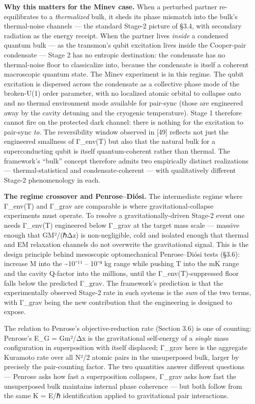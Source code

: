 \documentclass[
]{article}
\begin{document}
\textbf{Why this matters for the Minev case.} When a perturbed partner
re-equilibrates to a \emph{thermalized} bulk, it sheds its phase
mismatch into the bulk's thermal-noise channels --- the standard Stage-2
picture of §3.4, with secondary radiation as the energy receipt. When
the partner lives \emph{inside} a condensed quantum bulk --- as the
transmon's qubit excitation lives inside the Cooper-pair condensate ---
Stage 2 has no entropic destination: the condensate has no thermal-noise
floor to classicalize into, because the condensate is itself a coherent
macroscopic quantum state. The Minev experiment is in this regime. The
qubit excitation is dispersed across the condensate as a collective
phase mode of the broken-U(1) order parameter, with no localized atomic
orbital to collapse onto and no thermal environment mode available for
pair-sync (those are engineered away by the cavity detuning and the
cryogenic temperature). Stage 1 therefore cannot fire on the protected
dark channel: there is nothing for the excitation to pair-sync
\emph{to}. The reversibility window observed in {[}49{]} reflects not
just the engineered smallness of Γ\_env(T) but also that the natural
bulk for a superconducting qubit is itself quantum-coherent rather than
thermal. The framework's ``bulk'' concept therefore admits two
empirically distinct realizations --- thermal-statistical and
condensate-coherent --- with qualitatively different Stage-2
phenomenology in each.

\textbf{The regime crossover and Penrose--Diósi.} The intermediate
regime where Γ\_env(T) and Γ\_grav are comparable is where
gravitational-collapse experiments must operate. To resolve a
gravitationally-driven Stage-2 event one needs Γ\_env(T) engineered
below Γ\_grav at the target mass scale --- massive enough that GM²/(ℏΔz)
is non-negligible, cold and isolated enough that thermal and EM
relaxation channels do not overwrite the gravitational signal. This is
the design principle behind mesoscopic optomechanical Penrose--Diósi
tests (§3.6): increase M into the \textasciitilde10⁻¹¹ -- 10⁻⁹ kg range
while pushing T into the mK range and the cavity Q-factor into the
millions, until the Γ\_env(T)-suppressed floor falls below the predicted
Γ\_grav. The framework's prediction is that the experimentally observed
Stage-2 rate in such systems is the \emph{sum} of the two terms, with
Γ\_grav being the new contribution that the engineering is designed to
expose.

The relation to Penrose's objective-reduction rate (Section 3.6) is one
of counting: Penrose's E\_G = Gm²/Δx is the gravitational self-energy of
a \emph{single} mass configuration in superposition with itself
displaced; Γ\_grav here is the aggregate Kuramoto rate over all N²/2
atomic pairs in the unsuperposed bulk, larger by precisely the
pair-counting factor. The two quantities answer different questions ---
Penrose asks how fast a superposition collapses, Γ\_grav asks how fast
the unsuperposed bulk maintains internal phase coherence --- but both
follow from the same K = E/ℏ identification applied to gravitational
pair interactions.
\end{document}
